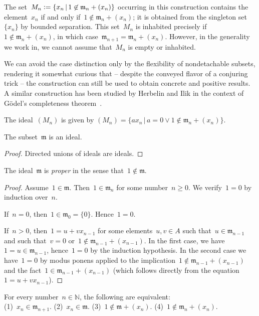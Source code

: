 \documentclass[envcountsect,envcountsame,runningheads]{llncs}
\newcommand{\mmm}{\mathfrak{m}}
\newcommand{\NN}{\mathbb{N}}
\newcommand{\defeq}{\vcentcolon=}
\renewcommand{\_}{\mathpunct{.}\,}
\begin{document}
The set~$M_n \defeq \{ x_n \,|\, 1 \not\in \mmm_n + (x_n) \}$ occurring in this
construction contains the element~$x_n$ if and only if~$1 \not\in \mmm_n +
(x_n)$; it is obtained from the singleton set~$\{x_n\}$ by bounded separation.
This set~$M_n$ is inhabited precisely if~$1 \not\in \mmm_n + (x_n)$, in which case~$\mmm_{n+1} = \mmm_n + (x_n)$.
However, in the generality we work in, we cannot assume that~$M_n$ is empty or
inhabited.

We can avoid the case distinction only by the flexibility of nondetachable
subsets, rendering it somewhat curious that -- despite the conveyed flavor of a
conjuring trick -- the construction can still be used to obtain concrete and
positive results. A similar construction has been studied by Herbelin and Ilik in the
context of Gödel's completeness theorem~\cite[p.~11]{herbelin-ilik:henkin}.

The ideal~$(M_n)$ is given by
$(M_n) = \{ a x_n \,|\, a = 0 \vee 1 \not\in \mmm_n + (x_n) \}$.

\begin{proposition}The subset~$\mmm$ is an ideal.
\end{proposition}

\begin{proof}Directed unions of ideals are ideals.\end{proof}

\begin{proposition}\label{prop:proper}
The ideal~$\mmm$ is \emph{proper} in the sense that~$1 \not\in \mmm$.\end{proposition}

\begin{proof}Assume~$1 \in \mmm$. Then~$1 \in \mmm_n$ for some number~$n \geq 0$. We
verify~$1 = 0$ by induction over~$n$.

If~$n = 0$, then~$1 \in \mmm_0 = \{0\}$. Hence~$1 = 0$.

If~$n > 0$, then~$1 = u + v x_{n-1}$ for some elements~$u,v \in A$ such that~$u
\in \mmm_{n-1}$ and such that~$v = 0$ or~$1 \not\in \mmm_{n-1} + (x_{n-1})$.
In the first case, we have~$1 = u \in \mmm_{n-1}$, hence~$1 = 0$ by the induction
hypothesis. In the second case we have~$1 = 0$ by modus ponens applied to the
implication~$1 \not\in \mmm_{n-1} + (x_{n-1})$ and the fact~$1 \in \mmm_{n-1} +
(x_{n-1})$ (which follows directly from the equation~$1 = u + v x_{n-1}$).
\end{proof}

\begin{lemma}\label{lemma:stage}
For every number~$n \in \NN$, the following are equivalent: \\
(1)~$x_n \in \mmm_{n+1}$.\quad
(2)~$x_n \in \mmm$.\quad
(3)~$1 \not\in \mmm + (x_n)$.\quad
(4)~$1 \not\in \mmm_n + (x_n)$.
\end{lemma}
\end{document}

